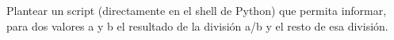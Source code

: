 Plantear un script (directamente en el shell de Python) que permita informar, para dos valores a y b el resultado de la división a/b y el resto de esa división.